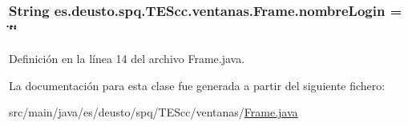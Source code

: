 \hypertarget{classes_1_1deusto_1_1spq_1_1_t_e_scc_1_1ventanas_1_1_frame_a1b79f2ac2def7c9b54ffc2ad0bee38b3}{
\subsubsection[{nombre\+Login}]{\setlength{\rightskip}{0pt plus 5cm}String es.\+deusto.\+spq.\+T\+E\+Scc.\+ventanas.\+Frame.\+nombre\+Login = \char`\"{}\char`\"{}\hspace{0.3cm}{\ttfamily [static]}}}\label{classes_1_1deusto_1_1spq_1_1_t_e_scc_1_1ventanas_1_1_frame_a1b79f2ac2def7c9b54ffc2ad0bee38b3}


Definición en la línea 14 del archivo Frame.\+java.



La documentación para esta clase fue generada a partir del siguiente fichero\+:\begin{DoxyCompactItemize}
\item 
src/main/java/es/deusto/spq/\+T\+E\+Scc/ventanas/\hyperlink{_frame_8java}{Frame.\+java}\end{DoxyCompactItemize}
